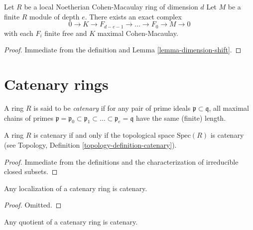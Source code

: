 \begin{lemma}
\label{lemma-mcm-resolution}
Let $R$ be a local Noetherian Cohen-Macaulay ring of dimension $d$
Let $M$ be a finite $R$ module of depth $e$.
There exists an exact complex
$$
0 \to K \to F_{d-e-1} \to \ldots \to F_0 \to M \to 0
$$
with each $F_i$ finite free and $K$ maximal Cohen-Macaulay.
\end{lemma}

\begin{proof}
Immediate from the definition and Lemma \ref{lemma-dimension-shift}.
\end{proof}








\section{Catenary rings}
\label{section-catenary}

\begin{definition}
\label{definition-catenary}
A ring $R$ is said to be {\it catenary} if for any pair of prime ideals
$\mathfrak p \subset \mathfrak q$, all maximal chains of primes
$\mathfrak p = \mathfrak p_0 \subset \mathfrak p_1 \subset \ldots \subset
\mathfrak p_e = \mathfrak q$ have the same (finite) length.
\end{definition}

\begin{lemma}
\label{lemma-catenary}
A ring $R$ is catenary if and only if the topological space
$\text{Spec}(R)$ is catenary (see
Topology, Definition \ref{topology-definition-catenary}).
\end{lemma}

\begin{proof}
Immediate from the definitions and the characterization of
irreducible closed subsets.
\end{proof}

\begin{lemma}
\label{lemma-localization-catenary}
Any localization of a catenary ring is catenary.
\end{lemma}

\begin{proof}
Omitted.
\end{proof}

\begin{lemma}
\label{lemma-quotient-catenary}
Any quotient of a catenary ring is catenary.
\end{lemma}

